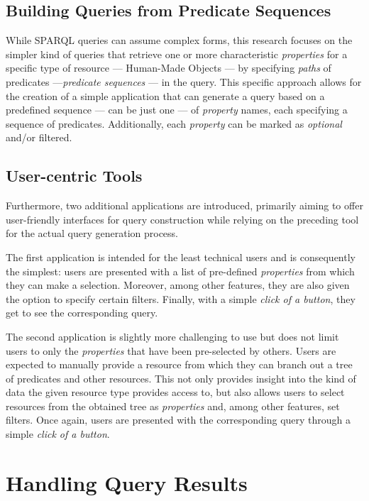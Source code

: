\documentclass[conference]{IEEEtran}
\begin{document}
\subsection{Building Queries from Predicate Sequences}
While SPARQL queries can assume complex forms, this research focuses on the simpler kind of queries that retrieve one or more characteristic \textit{properties} for a specific type of resource — Human-Made Objects — by specifying \textit{paths} of predicates —\textit{predicate sequences} — in the query. This specific approach allows for the creation of a simple application that can generate a query based on a predefined sequence — can be just one — of \textit{property} names, each specifying a sequence of predicates. Additionally, each \textit{property} can be marked as \textit{optional} and/or filtered.

\subsection{User-centric Tools}
Furthermore, two additional applications are introduced, primarily aiming to offer user-friendly interfaces for query construction while relying on the preceding tool for the actual query generation process.

The first application is intended for the least technical users and is consequently the simplest: users are presented with a list of pre-defined \textit{properties} from which they can make a selection. Moreover, among other features, they are also given the option to specify certain filters. Finally, with a simple \textit{click of a button}, they get to see the corresponding query.

The second application is slightly more challenging to use but does not limit users to only the \textit{properties} that have been pre-selected by others. Users are expected to manually provide a resource from which they can branch out a tree of predicates and other resources. This not only provides insight into the kind of data the given resource type provides access to, but also allows users to select resources from the obtained tree as \textit{properties} and, among other features, set filters. Once again, users are presented with the corresponding query through a simple \textit{click of a button}.

\section{Handling Query Results}
\end{document}
